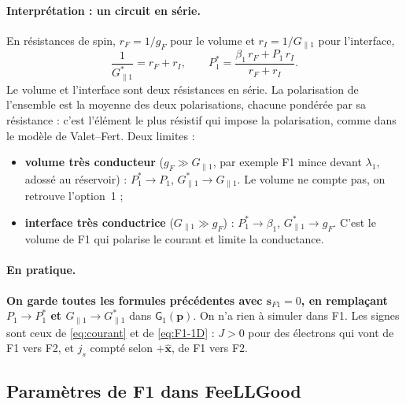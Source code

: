 \documentclass[11pt,a4paper]{article}
\newcommand{\vp}{\bm{p}}
\newcommand{\vs}{\bm{s}}
\newcommand{\mG}{\mathsf{G}}
\begin{document}
\paragraph{Interprétation : un circuit en série.} En résistances de spin,
$r_F = 1/g_F$ pour le volume et $r_I = 1/G_{\parallel1}$ pour l'interface,
\begin{equation}
  \frac{1}{G_{\parallel1}^*} = r_F + r_I,
  \qquad
  P_1^* = \frac{\beta_1\,r_F + P_1\,r_I}{r_F + r_I}.
\end{equation}
Le volume et l'interface sont deux résistances en série. La polarisation
de l'ensemble est la moyenne des deux polarisations, chacune pondérée par
sa résistance : c'est l'élément le plus résistif qui impose la
polarisation, comme dans le modèle de Valet--Fert. Deux limites :
\begin{itemize}
  \item \textbf{volume très conducteur} ($g_F\gg G_{\parallel1}$, par
    exemple F1 mince devant $\lambda_1$, adossé au réservoir) :
    $P_1^*\to P_1$, $G_{\parallel1}^*\to G_{\parallel1}$. Le volume ne
    compte pas, on retrouve l'option~1 ;
  \item \textbf{interface très conductrice} ($G_{\parallel1}\gg g_F$) :
    $P_1^*\to\beta_1$, $G_{\parallel1}^*\to g_F$. C'est le volume de F1 qui
    polarise le courant et limite la conductance.
\end{itemize}

\paragraph{En pratique.} \textbf{On garde toutes les formules précédentes
avec $\vs_{F1}=0$, en remplaçant $P_1\to P_1^*$ et
$G_{\parallel1}\to G_{\parallel1}^*$} dans $\mG_1(\vp)$. On n'a rien à
simuler dans F1. Les signes sont ceux de \eqref{eq:courant} et de
\eqref{eq:F1-1D} : $J>0$ pour des électrons qui vont de F1 vers F2, et $j_s$
compté selon $+\hat{\bm{x}}$, de F1 vers F2.

\subsection{Paramètres de F1 dans FeeLLGood}
\label{sec:F1-feellgood}
\end{document}

